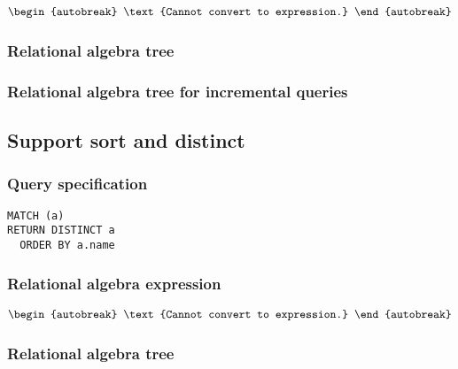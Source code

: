 \begin{align*}
\begin{autobreak}
\text{Cannot convert to expression.}
\end{autobreak}
\end{align*}

\subsubsection*{Relational algebra tree}


\subsubsection*{Relational algebra tree for incremental queries}


\subsection{Support sort and distinct}

\subsubsection*{Query specification}

\begin{lstlisting}
MATCH (a)
RETURN DISTINCT a
  ORDER BY a.name
\end{lstlisting}

\subsubsection*{Relational algebra expression}

\begin{align*}
\begin{autobreak}
\text{Cannot convert to expression.}
\end{autobreak}
\end{align*}

\subsubsection*{Relational algebra tree}


